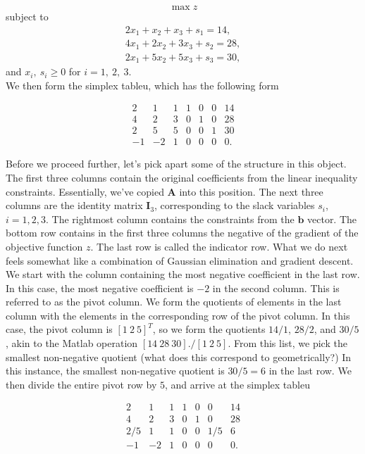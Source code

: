 \documentclass[12pt,english]{article}
\begin{document}
$$
\max z
$$
subject to 
$$
\begin{array}{c}
2 x_1 + x_2 + x_3 + s_1 = 14, \\
4 x_1 + 2 x_2 + 3 x_3 + s_2 = 28, \\
2 x_1 + 5 x_2 + 5 x_3 + s_3 = 30,
\end{array}
$$
and $x_i, ~ s_i \geq 0$ for $i=1, ~2, ~3.$ \\

We then form the simplex tableu, which has the following form

\begin{equation}\label{eq:1.3}
\begin{array}{cccccc|c}
2 	&	1	& 	1 	& 	1	& 	0	&	0	&	14 \\
4	&	2	& 	3	&	0	&	1	&	0	&	28 \\
2	&	5	&	5	&	0	&	0	& 	1	& 	30 \\
\hline
-1	& 	-2	&	1	& 	0	&	0	&	0	&	0.
\end{array}
\end{equation}

Before we proceed further, let's pick apart some of the structure in this object.  The first three columns contain the original coefficients from the linear inequality constraints.  Essentially, we've copied $\mathbf{A}$ into this position.  The next three columns are the identity matrix $\mathbf{I}_3$, corresponding to the slack variables $s_i$, $i=1, 2, 3.$  The rightmost column contains the constraints from the $\mathbf{b}$ vector.  The bottom row contains in the first three columns the negative of the gradient of the objective function $z$.  The last row is called the indicator row.   What we do next feels somewhat like a combination of Gaussian elimination and gradient descent.  We start with the column containing the most negative coefficient in the last row.  In this case, the most negative coefficient is $-2$ in the second column.  This is referred to as the pivot column.   We form the quotients of elements in the last column with the elements in the corresponding row of the pivot column.  In this case, the pivot column is $[1 ~2 ~5]^T$, so we form the quotients $14/1$, $28/2$, and $30/5$, akin to the Matlab operation $[14 ~28 ~30]./[1 ~2 ~5]$.  From this list, we pick the smallest non-negative quotient (what does this correspond to geometrically?)  In this instance, the smallest non-negative quotient is $30/5 = 6$ in the last row.   We then divide the entire pivot row by $5$, and arrive at the simplex tableu

\begin{equation}
\begin{array}{cccccc|c}
2 	&	1	& 	1 	& 	1	& 	0	&	0	&	14 \\
4	&	2	& 	3	&	0	&	1	&	0	&	28 \\
2/5	&	1	&	1	&	0	&	0	& 	1/5	& 	6  \\
\hline
-1	& 	-2	&	1	& 	0	&	0	&	0	&	0.
\end{array}
\end{equation}
\end{document}
